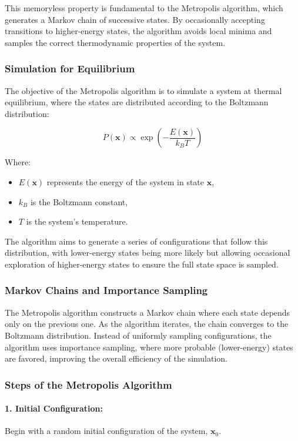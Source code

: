 \documentclass[11pt]{article}
\begin{document}
This memoryless property is fundamental to the Metropolis algorithm, which generates a Markov chain of successive states. By occasionally accepting transitions to higher-energy states, the algorithm avoids local minima and samples the correct thermodynamic properties of the system.

\subsubsection*{Simulation for Equilibrium}

The objective of the Metropolis algorithm is to simulate a system at thermal equilibrium, where the states are distributed according to the Boltzmann distribution:

\[
P(\mathbf{x}) \propto \exp\left( -\frac{E(\mathbf{x})}{k_B T} \right)
\]

Where:
\begin{itemize}
    \item \(E(\mathbf{x})\) represents the energy of the system in state \(\mathbf{x}\),
    \item \(k_B\) is the Boltzmann constant,
    \item \(T\) is the system's temperature.
\end{itemize}

The algorithm aims to generate a series of configurations that follow this distribution, with lower-energy states being more likely but allowing occasional exploration of higher-energy states to ensure the full state space is sampled.

\subsubsection*{Markov Chains and Importance Sampling}

The Metropolis algorithm constructs a Markov chain where each state depends only on the previous one. As the algorithm iterates, the chain converges to the Boltzmann distribution. Instead of uniformly sampling configurations, the algorithm uses importance sampling, where more probable (lower-energy) states are favored, improving the overall efficiency of the simulation.

\subsubsection*{Steps of the Metropolis Algorithm}

\paragraph*{1. Initial Configuration:}  
Begin with a random initial configuration of the system, \(\mathbf{x}_0\).
\end{document}
